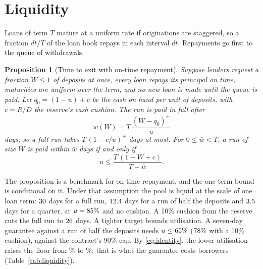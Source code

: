 \documentclass[preprint,11pt,authoryear]{elsarticle}
\newtheorem{proposition}{Proposition}
\theoremstyle{definition}
\begin{document}
\section{Liquidity}\label{sec:liquidity}

Loans of term $T$ mature at a uniform rate if originations are staggered, so a fraction $dt/T$ of the loan book
repays in each interval $dt$. Repayments go first to the queue of withdrawals.

\begin{proposition}[Time to exit with on-time repayment]\label{prop:liquidity}
Suppose lenders request a fraction $W\le1$ of deposits at once, every loan repays its principal on time, maturities are
uniform over the term, and no new loan is made until the queue is paid. Let $q_0=(1-u)+c$ be the cash on hand per unit of
deposits, with $c=R/D$ the reserve's cash cushion. The run is paid in full after
\begin{equation}\label{eq:wait}
  w(W)=T\,\frac{(W-q_0)^+}{u}
\end{equation}
days, so a full run takes $T\,(1-c/u)^+$ days at most. For $0\le\bar w<T$, a run of size $W$ is paid within $\bar w$ days
if and only if
\begin{equation}\label{eq:ubound}
  u\le\frac{T\,(1-W+c)}{T-\bar w}.
\end{equation}
\end{proposition}

The proposition is a benchmark for on-time repayment, and the one-term bound is conditional on it. Under that
assumption the pool is liquid at the scale of one loan term: $30$ days for a full run, $12.4$ days for a run
of half the deposits and $3.5$ days for a quarter, at $u=85\%$ and no cushion. A 10\% cushion
from the reserve cuts the full run to $26$ days. A tighter target bounds utilisation. A seven-day guarantee against
a run of half the deposits needs $u\le65\%$ ($78\%$ with a 10\% cushion), against the contract's
90\% cap. By \eqref{eq:identity}, the lower utilisation raises the floor from \AFreeAtCap\% to \AFreeAtULiq\%: that is what the
guarantee costs borrowers (Table~\ref{tab:liquidity}).
\end{document}
